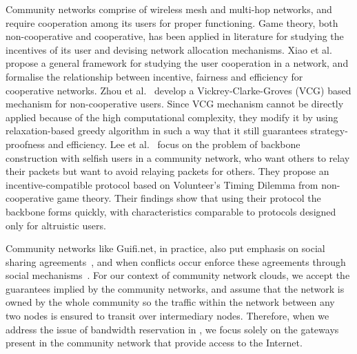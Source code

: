 Community networks comprise of wireless mesh and multi-hop networks,
and require cooperation among its users for proper functioning.
Game theory, both non-cooperative and cooperative, has been applied in literature for 
studying the incentives of its user and devising network allocation mechanisms.
Xiao et al.~\cite{Xiao2013} propose a general framework for studying the user cooperation in a network, 
and formalise the relationship between incentive, fairness and efficiency 
for cooperative networks.
%
Zhou et al.~\cite{Zhou2014} develop a Vickrey-Clarke-Groves (VCG) based mechanism for non-cooperative users.
Since VCG mechanism cannot be directly applied because of the high computational complexity,
they modify it by using relaxation-based greedy algorithm 
in such a way that it still guarantees strategy-proofness and efficiency.
%
Lee et al.~\cite{Lee2007} focus on the problem of backbone construction with selfish users 
in a community network, who want others to relay their packets but want to avoid relaying packets for others. 
They propose an incentive-compatible protocol based on Volunteer's Timing Dilemma 
from non-cooperative game theory.
Their findings show that using their protocol the backbone forms quickly, 
with characteristics comparable to protocols designed only for altruistic users.


Community networks like Guifi.net, in practice, 
also put emphasis on social sharing agreements~\cite{PicoPeering2005, WCL2010}, 
and when conflicts occur enforce these agreements through social mechanisms~\cite{Baig2015Guifi}.
For our context of community network clouds, 
we accept the guarantees implied by the community networks, 
and assume that the network is owned by the whole community
so the traffic within the network between any two nodes is ensured to transit over intermediary nodes. 
Therefore, when we address the issue of bandwidth reservation in , 
we focus solely on the gateways present in the community network that provide access to the Internet.


